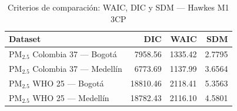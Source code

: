 \begin{table}[htbp]
\centering
\caption{Criterios de comparaci\'{o}n: WAIC, DIC y SDM --- Hawkes M1 3CP}
\label{tab:hawkes_criterios_3cp}
\begin{tabular}{lrrr}
\toprule
Dataset & DIC & WAIC & SDM \\
\midrule
PM$_{2.5}$ Colombia 37 --- Bogot\'{a} & 7958.56 & 1335.42 & 2.7795 \\
PM$_{2.5}$ Colombia 37 --- Medell\'{i}n & 6773.69 & 1137.99 & 3.6564 \\
PM$_{2.5}$ WHO 25 --- Bogot\'{a} & 18810.46 & 2118.41 & 5.3563 \\
PM$_{2.5}$ WHO 25 --- Medell\'{i}n & 18782.43 & 2116.10 & 4.5801 \\
\bottomrule
\end{tabular}
\end{table}

